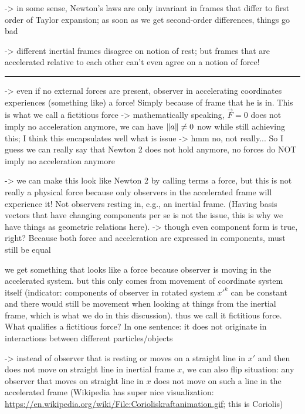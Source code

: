 \documentclass[../class_mech_main.tex]{subfiles}
\begin{document}
-> in some sense, Newton's laws are only invariant in frames that differ to first order of Taylor expansion; as soon as we get second-order differences, things go bad

-> different inertial frames disagree on notion of rest; but frames that are accelerated relative to each other can't even agree on a notion of force!


\hrule


-> even if no external forces are present, observer in accelerating coordinates experiences (something like) a force! Simply because of frame that he is in. This is what we call a fictitious force -> mathematically speaking, $\vec{F} = 0$ does not imply no acceleration anymore, we can have $\norm{a} \neq 0$ now while still achieving this; I think this encapsulates well what is issue -> hmm no, not really... So I guess we can really say that Newton 2 does not hold anymore, no forces do NOT imply no acceleration anymore

-> we can make this look like Newton 2 by calling terms a force, but this is not really a physical force because only observers in the accelerated frame will experience it! Not observers resting in, e.g., an inertial frame. (Having basis vectors that have changing components per se is not the issue, this is why we have things as geometric relations here). -> though even component form is true, right? Because both force and acceleration are expressed in components, must still be equal


we get something that looks like a force because observer is moving in the accelerated system. but this only comes from movement of coordinate system itself (indicator: components of observer in rotated system $x'^k$ can be constant and there would still be movement when looking at things from the inertial frame, which is what we do in this discussion). thus we call it fictitious force. What qualifies a fictitious force? In one sentence: it does not originate in interactions between different particles/objects


-> instead of observer that is resting or moves on a straight line in $x'$ and then does not move on straight line in inertial frame $x$, we can also flip situation: any observer that moves on straight line in $x$ does not move on such a line in the accelerated frame (Wikipedia has super nice visualization: \url{https://en.wikipedia.org/wiki/File:Corioliskraftanimation.gif}; this is Coriolis)



\newpage
\end{document}
